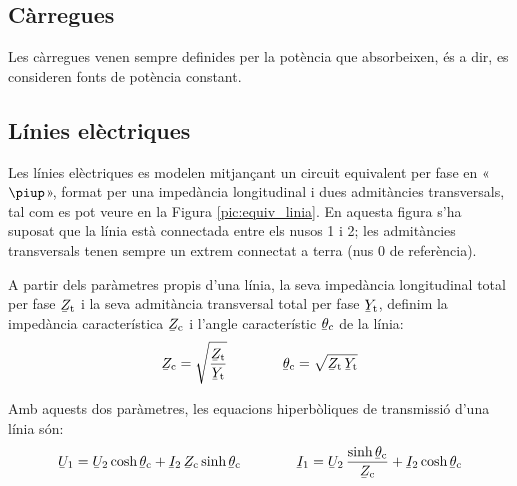 \subsection{Càrregues}

Les càrregues venen sempre definides per la potència que absorbeixen, és a dir, es consideren fonts de potència constant.

\subsection{Línies elèctriques} 

Les línies elèctriques es modelen mitjançant un circuit equivalent
per fase en «$\piup$», format per una impedància longitudinal i dues
admitàncies transversals, tal com es pot veure en la Figura
\vref{pic:equiv_linia}. En aquesta figura s'ha suposat que la línia
està connectada entre els nusos 1 i 2; les admitàncies transversals
tenen sempre un extrem connectat a terra (nus 0 de referència).

\begin{center}
    
    \label{pic:equiv_linia}
\end{center}

A partir dels paràmetres propis d'una línia, la seva impedància
longitudinal  total per fase $\cmplx{Z}\ped{t}$ i la seva admitància
transversal total per fase $\cmplx{Y}\ped{t}$, definim la impedància
característica $\cmplx{Z}\ped{c}$ i l'angle característic
$\cmplx{\theta}\ped{c}$ de la línia:   
\begin{equation}
   \cmplx{Z}\ped{c} = \sqrt{\frac{\cmplx{Z}\ped{t}}{\cmplx{Y}\ped{t}}} \qquad \qquad
   \cmplx{\theta}\ped{c} = \sqrt{\cmplx{Z}\ped{t} \,\cmplx{Y}\ped{t} }
\end{equation}

Amb aquests dos paràmetres, les equacions hiperbòliques de
transmissió d'una línia són: 
\begin{equation}\label{eq:linia_eq_trans}
   \cmplx{U}_1 = \cmplx{U}_2 \cosh \cmplx{\theta}\ped{c}  + \cmplx{I}_2 \,\cmplx{Z}\ped{c} \sinh \cmplx{\theta}\ped{c}   \qquad \qquad
   \cmplx{I}_1 = \cmplx{U}_2 \, \frac{\sinh \cmplx{\theta}\ped{c}}{\cmplx{Z}\ped{c}}  +   \cmplx{I}_2 \cosh \cmplx{\theta}\ped{c}
\end{equation}

